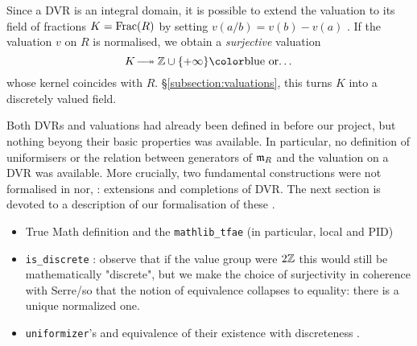 \documentclass[sigplan,10pt,anonymous,review]{acmart}
\begin{document}
Since a DVR is an integral domain, it is possible to extend the valuation to its field of fractions $K=\operatorname{Frac}(R)$ by setting $v(a/b)=v(b)-v(a)$ . If the valuation $v$ on $R$ is normalised, we obtain a \emph{surjective} valuation
\[
K\longtwoheadrightarrow \ZZ\cup\{+\infty\}\text{\fil{or\dots}}
\]
whose kernel coincides with $\unit{R}$.  \S\ref{subsection:valuations}, this turns $K$ into a discretely valued field. 


Both DVRs and valuations had already been defined in  before our project, but nothing beyong their basic properties was available. In particular, no definition of uniformisers or the relation between generators of $\mathfrak{m}_{R}$ and the valuation on a DVR was available. More crucially, two fundamental constructions were not formalised in \mathlib nor, : extensions and completions of DVR. The next section is devoted to a description of our formalisation of these .
\begin{itemize}
	\item True Math definition and the \texttt{mathlib\_tfae} (in particular, local and PID)
	\item \texttt{is\_discrete} : observe that if the value group were $2\mathbb{Z}$ this would still be mathematically "discrete", but we make the choice of surjectivity in coherence with Serre/so that the notion of equivalence collapses to equality: there is a unique normalized one.
	\item \texttt{uniformizer}'s and equivalence of their existence with discreteness
	.
\end{itemize}
\end{document}
